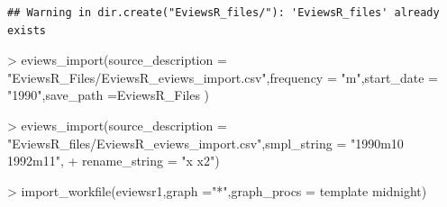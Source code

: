 \documentclass[
]{article}
\newenvironment{Shaded}{\begin{snugshade}}{\end{snugshade}}
\newcommand{\AttributeTok}[1]{\textcolor[rgb]{0.77,0.63,0.00}{#1}}
\newcommand{\FunctionTok}[1]{\textcolor[rgb]{0.00,0.00,0.00}{#1}}
\newcommand{\NormalTok}[1]{#1}
\newcommand{\SpecialCharTok}[1]{\textcolor[rgb]{0.00,0.00,0.00}{#1}}
\newcommand{\StringTok}[1]{\textcolor[rgb]{0.31,0.60,0.02}{#1}}
\begin{document}
\begin{verbatim}
## Warning in dir.create("EviewsR_files/"): 'EviewsR_files' already exists
\end{verbatim}

\begin{Shaded}
\begin{Highlighting}[]
\SpecialCharTok{\textgreater{}} \FunctionTok{eviews\_import}\NormalTok{(}\AttributeTok{source\_description =} \StringTok{"EviewsR\_Files/EviewsR\_eviews\_import.csv"}\NormalTok{,}\AttributeTok{frequency =} \StringTok{"m"}\NormalTok{,}\AttributeTok{start\_date =} \StringTok{"1990"}\NormalTok{,}\AttributeTok{save\_path =}\StringTok{\textquotesingle{}EviewsR\_Files\textquotesingle{}}\NormalTok{ )}
\end{Highlighting}
\end{Shaded}

\begin{Shaded}
\begin{Highlighting}[]
\SpecialCharTok{\textgreater{}} \FunctionTok{eviews\_import}\NormalTok{(}\AttributeTok{source\_description =} \StringTok{"EviewsR\_files/EviewsR\_eviews\_import.csv"}\NormalTok{,}\AttributeTok{smpl\_string =} \StringTok{"1990m10 1992m11"}\NormalTok{,}
\SpecialCharTok{+} \AttributeTok{rename\_string =} \StringTok{"x x2"}\NormalTok{)}
\end{Highlighting}
\end{Shaded}

\begin{Shaded}
\begin{Highlighting}[]
\SpecialCharTok{\textgreater{}} \FunctionTok{import\_workfile}\NormalTok{(}\StringTok{\textquotesingle{}eviewsr1\textquotesingle{}}\NormalTok{,}\AttributeTok{graph =}\StringTok{"*"}\NormalTok{,}\AttributeTok{graph\_procs =} \StringTok{\textquotesingle{}template midnight\textquotesingle{}}\NormalTok{)}
\end{Highlighting}
\end{Shaded}
\end{document}
